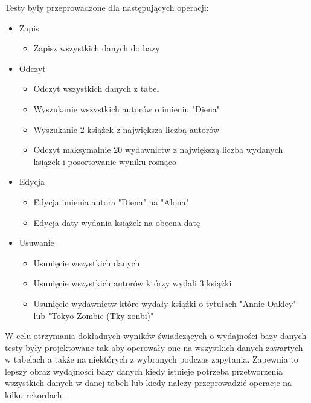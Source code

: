 Testy były przeprowadzone dla następujących operacji: 
\begin{itemize}
	 \item Zapis
  
  	\begin{itemize}
    		\item Zapisz wszystkich danych do bazy
	 \end{itemize}

	  \item Odczyt
	  
   	  \begin{itemize}
   		 \item Odczyt wszystkich danych z tabel
	     \item Wyszukanie wszystkich autorów o imieniu "Diena"
   		 \item Wyszukanie 2 książek z największa liczbą autorów
     	\item Odczyt maksymalnie 20 wydawnictw z największą liczba wydanych książek i posortowanie wyniku rosnąco   
  		\end{itemize}
  		
 	  \item Edycja

 	  	\begin{itemize}
	    		\item Edycja imienia autora "Diena" na "Alona"
	    		\item Edycja daty wydania książek na obecna datę
		 \end{itemize}

	   \item Usuwanie
	   
	    	\begin{itemize}
	    		\item Usunięcie wszystkich danych
	    		\item Usunięcie wszystkich autorów którzy wydali 3 książki
	    		\item Usunięcie wydawnictw które wydały książki o tytułach "Annie Oakley" lub "Tokyo Zombie (Tky zonbi)"
		 \end{itemize}	 
\end{itemize}

W celu otrzymania dokładnych wyników świadczących o wydajności bazy danych testy były projektowane tak aby operowały one na wszystkich danych zawartych w tabelach a także na niektórych z wybranych podczas zapytania. Zapewnia to lepszy obraz wydajności bazy danych kiedy istnieje potrzeba przetworzenia wszystkich danych w danej tabeli lub kiedy należy przeprowadzić operacje na kilku rekordach. 

